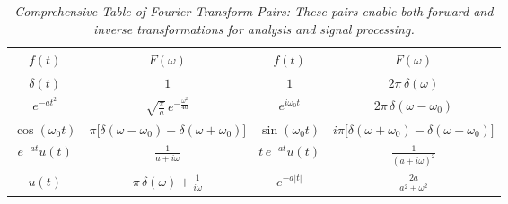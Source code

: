 {
  \renewcommand{\arraystretch}{2} %
  \begin{table}[H]
    \caption{\textit{Comprehensive Table of Fourier Transform Pairs: These pairs enable both forward and inverse transformations for analysis and signal processing.}}
    \label{table:fourier_transforms}
    \centering
    \begin{tabular}{|c|c||c|c|}
      \hline
      \(f(t)\) & \(F(\omega)\) & \(f(t)\) & \(F(\omega)\) \\ \hline
      \(\delta(t)\) & \(1\) & \(1\) & \(2\pi\,\delta(\omega)\) \\ \hline
      \(e^{-at^2}\) & \(\sqrt{\frac{\pi}{a}}\,e^{-\frac{\omega^2}{4a}}\) & \(e^{i\omega_0t}\) & \(2\pi\,\delta(\omega-\omega_0)\) \\ \hline
      \(\cos(\omega_0t)\) & \(\pi\Big[\delta(\omega-\omega_0)+\delta(\omega+\omega_0)\Big]\) & \(\sin(\omega_0t)\) & \(i\pi\Big[\delta(\omega+\omega_0)-\delta(\omega-\omega_0)\Big]\) \\ \hline
      \(e^{-at}u(t)\) & \(\frac{1}{a+i\omega}\) & \(t\,e^{-at}u(t)\) & \(\frac{1}{(a+i\omega)^2}\) \\ \hline
      \(u(t)\) & \(\pi\,\delta(\omega)+\frac{1}{i\omega}\) & \(e^{-a|t|}\) & \(\frac{2a}{a^2+\omega^2}\) \\ \hline
    \end{tabular}
  \end{table}
}

